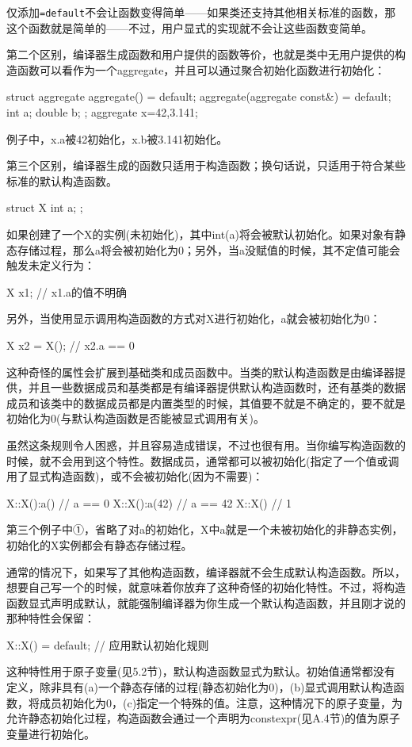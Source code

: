 仅添加\texttt{=default}不会让函数变得简单——如果类还支持其他相关标准的函数，那这个函数就是简单的——不过，用户显式的实现就不会让这些函数变简单。

第二个区别，编译器生成函数和用户提供的函数等价，也就是类中无用户提供的构造函数可以看作为一个aggregate，并且可以通过聚合初始化函数进行初始化：

\begin{cpp}
struct aggregate
{
  aggregate() = default;
  aggregate(aggregate const&) = default;
  int a;
  double b;
};
aggregate x={42,3.141};
\end{cpp}

例子中，x.a被42初始化，x.b被3.141初始化。

第三个区别，编译器生成的函数只适用于构造函数；换句话说，只适用于符合某些标准的默认构造函数。

\begin{cpp}
struct X
{
  int a;
};
\end{cpp}

如果创建了一个X的实例(未初始化)，其中int(a)将会被默认初始化。如果对象有静态存储过程，那么a将会被初始化为0；另外，当a没赋值的时候，其不定值可能会触发未定义行为：

\begin{cpp}
X x1;  // x1.a的值不明确
\end{cpp}

另外，当使用显示调用构造函数的方式对X进行初始化，a就会被初始化为0：

\begin{cpp}
X x2 = X();  // x2.a == 0
\end{cpp}

这种奇怪的属性会扩展到基础类和成员函数中。当类的默认构造函数是由编译器提供，并且一些数据成员和基类都是有编译器提供默认构造函数时，还有基类的数据成员和该类中的数据成员都是内置类型的时候，其值要不就是不确定的，要不就是初始化为0(与默认构造函数是否能被显式调用有关)。

虽然这条规则令人困惑，并且容易造成错误，不过也很有用。当你编写构造函数的时候，就不会用到这个特性。数据成员，通常都可以被初始化(指定了一个值或调用了显式构造函数)，或不会被初始化(因为不需要)：

\begin{cpp}
X::X():a(){}  // a == 0
X::X():a(42){}  // a == 42
X::X(){}  // 1
\end{cpp}

第三个例子中①，省略了对a的初始化，X中a就是一个未被初始化的非静态实例，初始化的X实例都会有静态存储过程。

通常的情况下，如果写了其他构造函数，编译器就不会生成默认构造函数。所以，想要自己写一个的时候，就意味着你放弃了这种奇怪的初始化特性。不过，将构造函数显式声明成默认，就能强制编译器为你生成一个默认构造函数，并且刚才说的那种特性会保留：

\begin{cpp}
X::X() = default;  // 应用默认初始化规则
\end{cpp}

这种特性用于原子变量(见5.2节)，默认构造函数显式为默认。初始值通常都没有定义，除非具有(a)一个静态存储的过程(静态初始化为0)，(b)显式调用默认构造函数，将成员初始化为0，(c)指定一个特殊的值。注意，这种情况下的原子变量，为允许静态初始化过程，构造函数会通过一个声明为constexpr(见A.4节)的值为原子变量进行初始化。